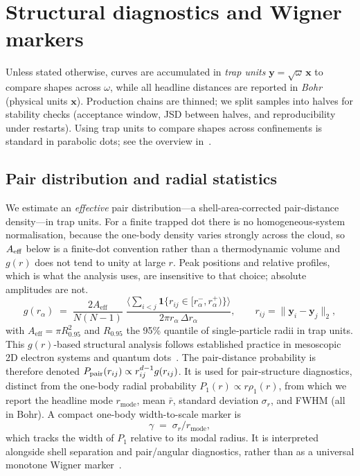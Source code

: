 \section{Structural diagnostics and Wigner markers}
\label{sec:analysis-struct}

Unless stated otherwise, curves are accumulated in \emph{trap units} 
$\mathbf{y}=\sqrt{\omega}\,\mathbf{x}$ to compare shapes across $\omega$, 
while all headline distances are reported in \emph{Bohr} (physical units $\mathbf{x}$).
Production chains are thinned; we split samples into halves for stability checks 
(acceptance window, JSD between halves, and reproducibility under restarts).
Using trap units to compare shapes across confinements is standard in parabolic dots; 
see the overview in~\cite{manninen2007metalclustersquantumdots}.

\subsection{Pair distribution and radial statistics}
\label{subsec:gr-pr}

We estimate an \emph{effective} pair distribution---a shell-area-corrected pair-distance
density---in trap units. For a finite trapped dot there is no homogeneous-system
normalisation, because the one-body density varies strongly across the cloud, so $A_{\rm eff}$
below is a finite-dot convention rather than a thermodynamic volume and $g(r)$ does not tend
to unity at large $r$. Peak positions and relative profiles, which is what the analysis uses,
are insensitive to that choice; absolute amplitudes are not.
\begin{equation}
g(r_\alpha)\;=\;\frac{2A_{\mathrm{eff}}}{N(N-1)}\;
\frac{\big\langle\sum_{i<j}\mathbf{1}\{r_{ij}\!\in[r_\alpha^-,r_\alpha^+)\}\big\rangle}
{2\pi r_\alpha\,\Delta r_\alpha},
\qquad r_{ij}=\|\mathbf{y}_i-\mathbf{y}_j\|_2,
\end{equation}
with $A_{\mathrm{eff}}=\pi R_{0.95}^2$ and $R_{0.95}$ the 95\% quantile of single‐particle radii in trap units.
This $g(r)$-based structural analysis follows established practice in mesoscopic 2D electron systems
and quantum dots~\cite{Filinov_2001,Egger_1999,manninen2007metalclustersquantumdots}.
The pair-distance probability is therefore denoted
\(
P_{\rm pair}(r_{ij})\propto r_{ij}^{d-1}g(r_{ij})
\).
It is used for pair-structure diagnostics, distinct from the one-body radial
probability
\(
P_1(r)\propto r\rho_1(r)
\),
from which we report the headline mode $r_{\mathrm{mode}}$, mean $\bar r$,
standard deviation $\sigma_r$, and FWHM (all in Bohr). A compact one-body
width-to-scale marker is
\begin{equation}
\gamma \;=\; \sigma_r / r_{\mathrm{mode}},
\label{eq:gamma}
\end{equation}
which tracks the width of $P_1$ relative to its modal radius. It is interpreted
alongside shell separation and pair/angular diagnostics, rather than as a
universal monotone Wigner marker~\cite{Egger_1999,Filinov_2001}.

